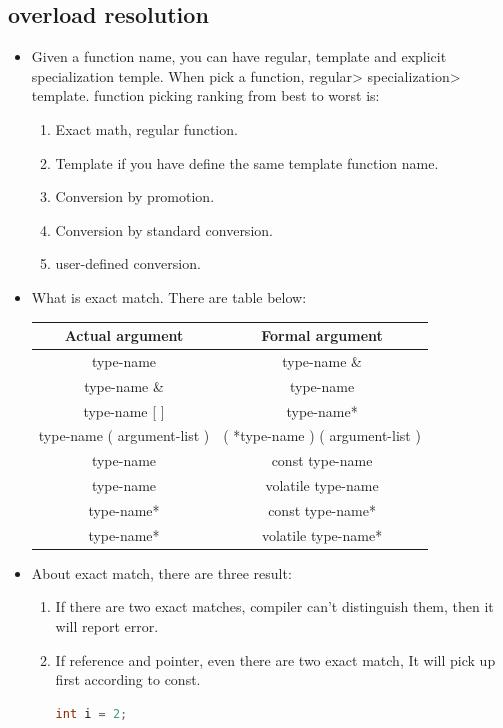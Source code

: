 \documentclass[a4paper,11pt,twoside]{book}
\newcommand{\tophline}{\hline }
\newcommand{\bottomhline}{\\ \hline }
\newcommand{\tophline}{ }
\newcommand{\bottomhline}{ }
\begin{document}
\subsection{overload resolution}
\begin{itemize}
	\item Given a function name, you can have regular, template and explicit specialization temple. When pick a function, regular> specialization> template. function picking ranking from best to worst is:
	\begin{enumerate}
		\item Exact math, regular function.
		\item Template if you have define the same template function name.
		\item Conversion by promotion.
		\item Conversion by standard conversion.
		\item user-defined conversion.
	\end{enumerate}

\item What is exact match. There are table below:

\begin{tabular}{|c|c|}
\tophline
Actual argument & Formal argument \\
\tophline
type-name & type-name \& \\
\tophline
type-name \& & type-name \\ \tophline
type-name [ ] &  type-name* \\ \tophline
type-name ( argument-list ) & ( *type-name ) ( argument-list ) \\ \tophline
type-name  & const type-name \\ \tophline
type-name  &  volatile  type-name \\ \tophline
type-name*  & const type-name*  \\ \tophline
type-name*  & volatile  type-name*  \bottomhline
\end{tabular}

	\item About exact match, there are three result:
	\begin{enumerate}
		\item If there are two exact matches, compiler can't distinguish them, then it will report error.
		
		\item If reference and pointer, even there are two exact match, It will pick up first according to const.
\begin{lstlisting}[frame=single, language=c++]
int i = 2;


\end{lstlisting}
\end{enumerate}
\end{itemize}
\end{document}
